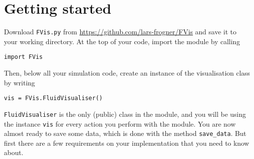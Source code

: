 \documentclass{article}
\newcommand{\ttt}[1]{\texttt{#1}}
\begin{document}
\section{Getting started}
\label{sec:start}
Download \ttt{FVis.py} from \url{https://github.com/lars-frogner/FVis} and save it to your working directory. At the top of your code, import the module by calling
\begin{lstlisting}
import FVis
\end{lstlisting}
Then, below all your simulation code, create an instance of the visualisation class by writing
\begin{lstlisting}
vis = FVis.FluidVisualiser()
\end{lstlisting}
\ttt{FluidVisualiser} is the only (public) class in the module, and you will be using the instance \ttt{vis} for every action you perform with the module. You are now almost ready to save some data, which is done with the method \ttt{save\_data}. But first there are a few requirements on your implementation that you need to know about.
\end{document}
